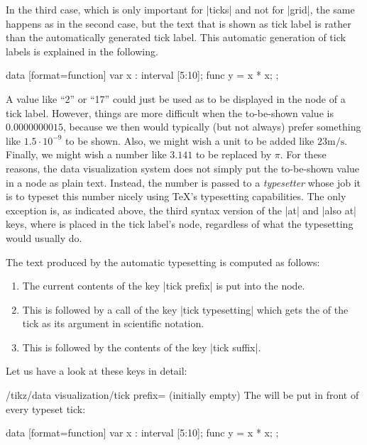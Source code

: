 In the third case, which is only important for |ticks| and not for
|grid|, the same happens as in the second case, but the 
text that is shown as tick label is  rather than the 
automatically generated tick label. This automatic generation of tick
labels is explained in the following.

\begin{codeexample}[]
\tikz \datavisualization
  [scientific axes=clean,
   x axis={length=2.5cm, ticks={major at={
         5,
         6 as [style=red],
         7 as [{style=blue, low=-1em}],
         8 as [style=green] $2^3$,
         10 as ten
       }}},
   visualize as line]
  data [format=function] {
    var x : interval [5:10];
    func y = \value x * \value x;
  };
\end{codeexample}


A value like ``2'' or ``17'' could just be used as  to be
displayed in the node of a tick label. However, things are more
difficult when the to-be-shown value is $0.0000000015$, because we
then would typically (but not always) prefer something like $1.5 \cdot
10^{-9}$ to be shown. Also, we might wish a unit to be added like
$23\mathrm{m}/\mathrm{s}$. Finally, we might wish a number like
$3.141$ to be replaced by $\pi$. For these reasons, the data
visualization system does not simply put the to-be-shown value in a
node as plain text. Instead, the number is passed to a
\emph{typesetter} whose job it is to typeset this number nicely using
\TeX's typesetting capabilities. The only exception is, as indicated
above, the third syntax version of the |at| and |also at| keys, where
 is placed in the tick label's node, regardless of what the
typesetting would usually do.

The text produced by the automatic typesetting is computed as follows:
\begin{enumerate}
\item The current contents of the key |tick prefix| is put into the node.
\item This is followed by a call of the key |tick typesetting| which
  gets the  of the tick as its argument in scientific
  notation.
\item This is followed by the contents of the key |tick suffix|.
\end{enumerate}

Let us have a look at these keys in detail:

\begin{key}{/tikz/data visualization/tick prefix=
    (initially \normalfont empty)}
  The  will be put in front of every typeset tick:
\begin{codeexample}[]
\tikz \datavisualization
  [scientific axes, all axes={ticks=few, length=2.5cm},
   x axis={ticks={tick prefix=$\langle$, tick suffix=$]$}},
   visualize as line]
  data [format=function] {
    var x : interval [5:10];
    func y = \value x * \value x;
  };
\end{codeexample}
\end{key}

